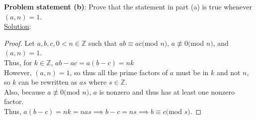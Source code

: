 \documentclass{article} %
\begin{document}
\hfill \break

\textbf{Problem statement (b)}: Prove that the statement in part (a) is true whenever $(a,n) = 1$.
\\

\underline{Solution}: 
\begin{addmargin}[1em]{0em}
\begin{proof}
Let $a,b,c,0<n \in \mathbb{Z}$ such that $ab \equiv ac($mod $n)$, $a \not\equiv 0($mod $n)$, and $(a,n) = 1$.
\\Thus, for $k \in \mathbb{Z}$, $ab - ac = a(b-c)=nk$
\\However, $(a,n) = 1$, so thus all the prime factors of $a$ must be in $k$ and not $n$, so $k$ can be rewritten as $as$ where $s \in \mathbb{Z}$.
\\Also, because $a \not\equiv 0($mod $n)$, $a$ is nonzero and thus has at least one nonzero factor.
\\Thus, $a(b-c) = nk = nas \implies b - c = ns \implies b \equiv c($mod $s)$.
\end{proof}
\end{addmargin}

\end{document}
